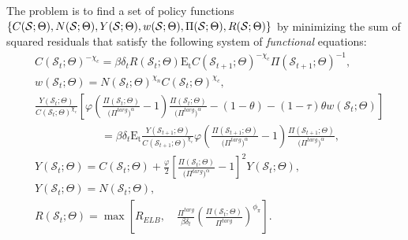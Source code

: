 \documentclass[11pt]{article}
\begin{document}
\begin{singlespace}
	    The problem is to find a set of policy functions $\{C(\mathcal{S};\Theta), N(\mathcal{S};\Theta), Y(\mathcal{S};\Theta), w(\mathcal{S};\Theta), \Pi(\mathcal{S};\Theta), \\ R(\mathcal{S};\Theta)\}$ by minimizing the sum of squared residuals that satisfy the following system of \emph{functional} equations:
	    \begin{align}
		& C(\mathcal{S}_{t};\Theta)^{-\chi_{c}} = \beta\delta_{t}R(\mathcal{S}_{t};\Theta)\mathrm{E_{t}}C(\mathcal{S}_{t+1};\Theta)^{-\chi_{c}}\Pi(\mathcal{S}_{t+1};\Theta)^{-1},\\
		& w(\mathcal{S}_{t};\Theta)=N(\mathcal{S}_{t};\Theta)^{\chi_{n}}C(\mathcal{S}_{t};\Theta)^{\chi_{c}},\\
		& \frac{Y(\mathcal{S}_{t};\Theta)}{C(\mathcal{S}_{t};\Theta)^{\chi_{c}}}\left[\varphi \left(\frac{\Pi(\mathcal{S}_{t};\Theta)}{\bigl(\Pi^{targ}\bigr)^{\alpha}}-1\right)\frac{\Pi(\mathcal{S}_{t};\Theta)}{\bigl(\Pi^{targ}\bigr)^{\alpha}} - (1-\theta)- (1-\tau)\theta w(\mathcal{S}_{t};\Theta)\right]\\ \nonumber
		& \hspace{6em}= \beta\delta_{t}\mathrm{E_{t}}\frac{Y(\mathcal{S}_{t+1};\Theta)}{C(\mathcal{S}_{t+1};\Theta)^{\chi_{c}}}\varphi \left(\frac{\Pi(\mathcal{S}_{t+1};\Theta)}{\bigl(\Pi^{targ}\bigr)^{\alpha}}-1\right)\frac{\Pi(\mathcal{S}_{t+1};\Theta)}{\bigl(\Pi^{targ}\bigr)^{\alpha}},\\
		& Y(\mathcal{S}_{t};\Theta) = C(\mathcal{S}_{t};\Theta) + \frac{\varphi}{2}\left[\frac{\Pi(\mathcal{S}_{t};\Theta)}{\bigl(\Pi^{targ}\bigr)^{\alpha}}-1\right]^{2}Y(\mathcal{S}_{t};\Theta),\\
		& Y(\mathcal{S}_{t};\Theta)=N(\mathcal{S}_{t};\Theta),\\
		& R(\mathcal{S}_{t};\Theta) = \max \left[R_{ELB}, \quad\frac{\Pi^{targ}}{\beta\delta_t}\left(\frac{\Pi(\mathcal{S}_{t};\Theta)}{\Pi^{targ}}\right)^{\phi_{\pi}}\right].
	\end{align}


\end{singlespace}
\end{document}
